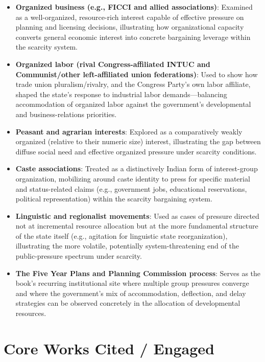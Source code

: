 \documentclass[12pt]{article}
\begin{document}
\begin{itemize}[leftmargin=*, itemsep=4pt]
    \item \textbf{Organized business (e.g., FICCI and allied associations)}: Examined as a well-organized, resource-rich interest capable of effective pressure on planning and licensing decisions, illustrating how organizational capacity converts general economic interest into concrete bargaining leverage within the scarcity system.
    \item \textbf{Organized labor (rival Congress-affiliated INTUC and Communist/other left-affiliated union federations)}: Used to show how trade union pluralism/rivalry, and the Congress Party's own labor affiliate, shaped the state's response to industrial labor demands---balancing accommodation of organized labor against the government's developmental and business-relations priorities.
    \item \textbf{Peasant and agrarian interests}: Explored as a comparatively weakly organized (relative to their numeric size) interest, illustrating the gap between diffuse social need and effective organized pressure under scarcity conditions.
    \item \textbf{Caste associations}: Treated as a distinctively Indian form of interest-group organization, mobilizing around caste identity to press for specific material and status-related claims (e.g., government jobs, educational reservations, political representation) within the scarcity bargaining system.
    \item \textbf{Linguistic and regionalist movements}: Used as cases of pressure directed not at incremental resource allocation but at the more fundamental structure of the state itself (e.g., agitation for linguistic state reorganization), illustrating the more volatile, potentially system-threatening end of the public-pressure spectrum under scarcity.
    \item \textbf{The Five Year Plans and Planning Commission process}: Serves as the book's recurring institutional site where multiple group pressures converge and where the government's mix of accommodation, deflection, and delay strategies can be observed concretely in the allocation of developmental resources.
\end{itemize}

\section{Core Works Cited / Engaged}
\end{document}
